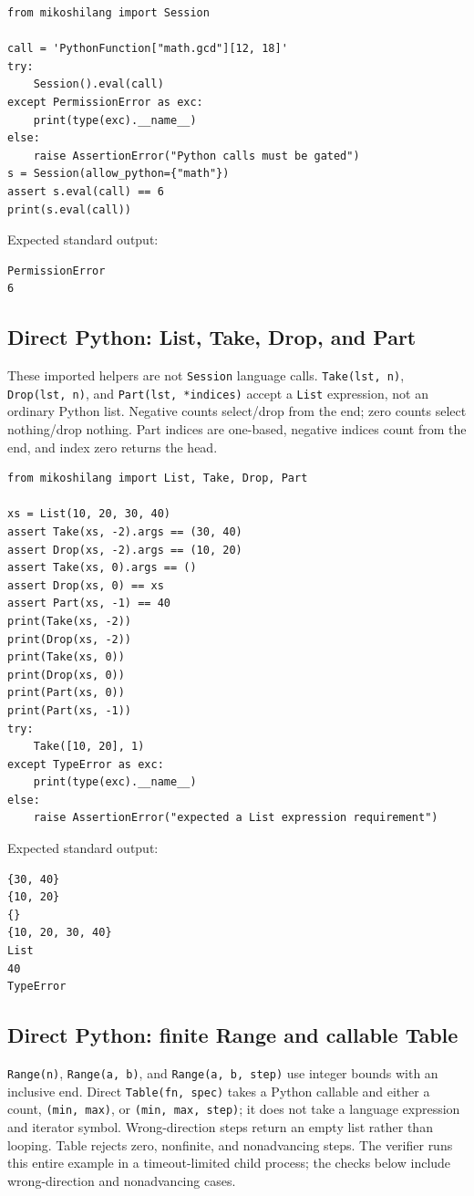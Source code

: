 \begin{lstlisting}[style=mikoshi]
from mikoshilang import Session

call = 'PythonFunction["math.gcd"][12, 18]'
try:
    Session().eval(call)
except PermissionError as exc:
    print(type(exc).__name__)
else:
    raise AssertionError("Python calls must be gated")
s = Session(allow_python={"math"})
assert s.eval(call) == 6
print(s.eval(call))
\end{lstlisting}
\noindent Expected standard output:
\begin{lstlisting}[style=mikoshi]
PermissionError
6
\end{lstlisting}

\subsection{Direct Python: List, Take, Drop, and Part}
These imported helpers are not \texttt{Session} language calls. \texttt{Take(lst, n)}, \texttt{Drop(lst, n)}, and \texttt{Part(lst, *indices)} accept a \texttt{List} expression, not an ordinary Python list. Negative counts select/drop from the end; zero counts select nothing/drop nothing. Part indices are one-based, negative indices count from the end, and index zero returns the head.

\begin{lstlisting}[style=mikoshi]
from mikoshilang import List, Take, Drop, Part

xs = List(10, 20, 30, 40)
assert Take(xs, -2).args == (30, 40)
assert Drop(xs, -2).args == (10, 20)
assert Take(xs, 0).args == ()
assert Drop(xs, 0) == xs
assert Part(xs, -1) == 40
print(Take(xs, -2))
print(Drop(xs, -2))
print(Take(xs, 0))
print(Drop(xs, 0))
print(Part(xs, 0))
print(Part(xs, -1))
try:
    Take([10, 20], 1)
except TypeError as exc:
    print(type(exc).__name__)
else:
    raise AssertionError("expected a List expression requirement")
\end{lstlisting}
\noindent Expected standard output:
\begin{lstlisting}[style=mikoshi]
{30, 40}
{10, 20}
{}
{10, 20, 30, 40}
List
40
TypeError
\end{lstlisting}

\subsection{Direct Python: finite Range and callable Table}
\texttt{Range(n)}, \texttt{Range(a, b)}, and \texttt{Range(a, b, step)} use integer bounds with an inclusive end. Direct \texttt{Table(fn, spec)} takes a Python callable and either a count, \texttt{(min, max)}, or \texttt{(min, max, step)}; it does not take a language expression and iterator symbol. Wrong-direction steps return an empty list rather than looping. Table rejects zero, nonfinite, and nonadvancing steps. The verifier runs this entire example in a timeout-limited child process; the checks below include wrong-direction and nonadvancing cases.

